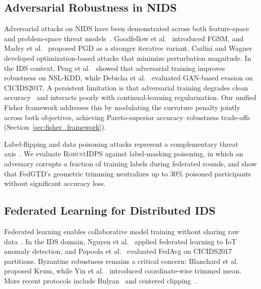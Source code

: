 \documentclass[journal,twoside]{IEEEtran}
\begin{document}
\subsection{Adversarial Robustness in NIDS}
\label{sec:rw_adv}

Adversarial attacks on NIDS have been demonstrated across both feature-space
and problem-space threat models~\cite{hashemi2019towards, apruzzese2023real}.
Goodfellow et al.~\cite{goodfellow2015explaining} introduced FGSM, and
Madry et al.~\cite{madry2018towards} proposed PGD as a stronger iterative
variant. Carlini and Wagner~\cite{carlini2017towards} developed optimization-based
attacks that minimize perturbation magnitude. In the IDS context,
Peng et al.~\cite{peng2019adversarial} showed that adversarial training
improves robustness on NSL-KDD, while Debicha et al.~\cite{debicha2023adv}
evaluated GAN-based evasion on CICIDS2017. A persistent limitation is that
adversarial training degrades clean accuracy~\cite{tsipras2019robustness}
and interacts poorly with continual-learning regularization. Our unified Fisher
framework addresses this by modulating the curvature penalty jointly across
both objectives, achieving Pareto-superior accuracy--robustness trade-offs
(Section~\ref{sec:fisher_framework}).

Label-flipping and data poisoning attacks represent a complementary threat
axis~\cite{biggio2012poisoning, shafahi2018poison}. We evaluate
\textsc{RobustIDPS} against label-masking poisoning, in which an adversary
corrupts a fraction of training labels during federated rounds, and show that
FedGTD's geometric trimming neutralizes up to 30\% poisoned participants
without significant accuracy loss.

\subsection{Federated Learning for Distributed IDS}
\label{sec:rw_fl}

Federated learning enables collaborative model training without sharing raw
data~\cite{mcmahan2017communication}. In the IDS domain, Nguyen et al.~\cite{nguyen2019diot}
applied federated learning to IoT anomaly detection, and
Popoola et al.~\cite{popoola2021federated} evaluated FedAvg on CICIDS2017
partitions. Byzantine robustness remains a critical concern: Blanchard
et al.~\cite{blanchard2017machine} proposed Krum, while Yin et al.~\cite{yin2018byzantine}
introduced coordinate-wise trimmed mean. More recent protocols include
Bulyan~\cite{guerraoui2018hidden} and centered clipping~\cite{karimireddy2022byzantinerobust}.
\end{document}

